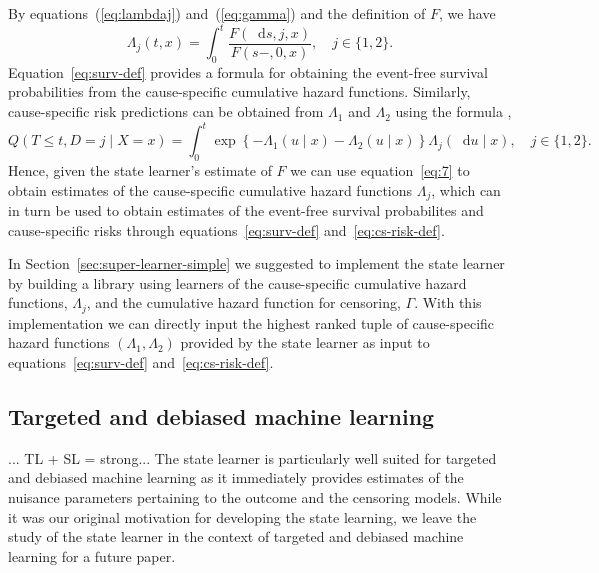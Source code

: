 \documentclass[a4paper,danish]{article}
\theoremstyle{plain} %
\numberwithin{theorem}{section}
\theoremstyle{definition} %
\theoremstyle{remark}
\newcommand*\diff{\mathop{}\!\mathrm{d}}
\newcommand{\1}{\mathds{1}}
\begin{document}
By equations~(\ref{eq:lambdaj}) and~(\ref{eq:gamma}) and the
definition of \( F \), we have
\begin{equation}
  \label{eq:7}
  \Lambda_j(t , x) 
  = \int_0^t  \frac{F(\diff s, j, x )}{F(s-, 0, x )},
  \quad j \in \{1,2\}.
\end{equation}
Equation~\eqref{eq:surv-def} provides a formula for obtaining
the event-free survival probabilities from the cause-specific
cumulative hazard functions. Similarly, cause-specific risk
predictions can be obtained from \( \Lambda_1 \) and
$\Lambda_2$ using the formula
\citep[e.g.,][]{benichou1990estimates,
  ozenne2017riskregression},
\begin{equation}
  \label{eq:cs-risk-def}
  Q(T \leq t, D = j \mid X=x) =
  \int_0^t \exp\left\{-\Lambda_{1}(u \mid x)-\Lambda_{2}(u
    \mid x)\right\}  \Lambda_j(\diff u \mid x),
  \quad j \in \{1,2\}.
\end{equation}
Hence, given the state learner's estimate of \( F \) we can
use equation~\eqref{eq:7} to obtain estimates of the
cause-specific cumulative hazard functions $\Lambda_j$, which
can in turn be used to obtain estimates of the event-free
survival probabilites and cause-specific risks through
equations~\eqref{eq:surv-def} and~\eqref{eq:cs-risk-def}.

In Section~\ref{sec:super-learner-simple} we suggested to
implement the state learner by building a library using
learners of the cause-specific cumulative hazard functions,
$\Lambda_j$, and the cumulative hazard function for censoring,
$\Gamma$. With this implementation we can directly input the
highest ranked tuple of cause-specific hazard functions
$(\Lambda_1, \Lambda_2)$ provided by the state learner as
input to equations~\eqref{eq:surv-def}
and~\eqref{eq:cs-risk-def}.

\subsection{Targeted and debiased machine learning}
\label{sec:targeted-learning}

... TL + SL = strong... The state learner is particularly well
suited for targeted and debiased machine learning as it
immediately provides estimates of the nuisance parameters
pertaining to the outcome and the censoring models. While it
was our original motivation for developing the state learning,
we leave the study of the state learner in the context of
targeted and debiased machine learning for a future paper.
\end{document}
